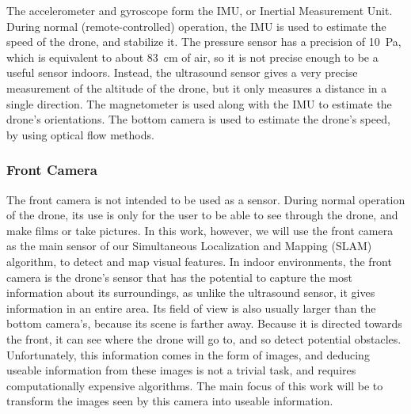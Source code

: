 The accelerometer and gyroscope form the IMU, or Inertial Measurement Unit. During normal (remote-controlled) operation, the IMU is used to estimate the speed of the drone, and stabilize it. The pressure sensor has a precision of \SI{10}{\pascal}, which is equivalent to about \SI{83}{\centi\metre} of air, so it is not precise enough to be a useful sensor indoors. Instead, the ultrasound sensor gives a very precise measurement of the altitude of the drone, but it only measures a distance in a single direction. The magnetometer is used along with the IMU to estimate the drone's orientations. The bottom camera is used to estimate the drone's speed, by using optical flow methods.

\subsubsection{Front Camera}
The front camera is not intended to be used as a sensor. During normal operation of the drone, its use is only for the user to be able to see through the drone, and make films or take pictures. In this work, however, we will use the front camera as the main sensor of our Simultaneous Localization and Mapping (SLAM) algorithm, to detect and map visual features. In indoor environments, the front camera is the drone's sensor that has the potential to capture the most information about its surroundings, as unlike the ultrasound sensor, it gives information in an entire area. Its field of view is also usually larger than the bottom camera's, because its scene is farther away. Because it is directed towards the front, it can see where the drone will go to, and so detect potential obstacles. Unfortunately, this information comes in the form of images, and deducing useable information from these images is not a trivial task, and requires computationally expensive algorithms. The main focus of this work will be to transform the images seen by this camera into useable information.

